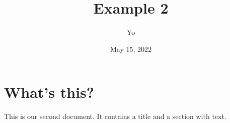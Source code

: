 \documentclass[a4paper, 11pt]{article}
\begin{document}
	\title{Example 2}
	\author{Yo}
	\date{May 15, 2022}
	\maketitle %
	
	 
	\section{What's this?} %
	This is our second document. It contains a title and a section with text.
\end{document}
